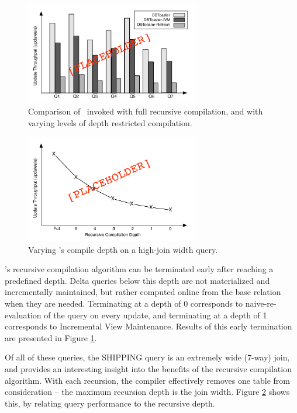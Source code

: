 \begin{figure}
\begin{center}
\includegraphics[width=3in]{../graphics-tmp/placeholder_throughput_all}
\end{center}
\label{fig:experiments:throughput_depth}
\caption{Comparison of \dbtoaster\ invoked with full recursive compilation, and with varying levels of depth restricted compilation.}
\end{figure}

\begin{figure}
\begin{center}
\includegraphics[width=3in]{../graphics-tmp/placeholder_throughput_ssb4}
\end{center}
\label{fig:experiments:throughput_depth_ssb4}
\caption{Varying \dbtoaster 's compile depth on a high-join width query.}
\end{figure}

\dbtoaster 's recursive compilation algorithm can be terminated early after reaching a predefined depth.  Delta queries below this depth are not materialized and incrementally maintained, but rather computed online from the base relation when they are needed.  Terminating at a depth of 0 corresponds to naive-re-evaluation of the query on every update, and terminating at a depth of 1 corresponds to Incremental View Maintenance.  Results of this early termination are presented in Figure \ref{fig:experiments:throughput_depth}.  

Of all of these queries, the SHIPPING query is an extremely wide (7-way) join, and provides an interesting insight into the benefits of the recursive compilation algorithm.  With each recursion, the compiler effectively removes one table from consideration -- the maximum recursion depth is the join width.  Figure \ref{fig:experiments:throughput_depth_ssb4} shows this, by relating query performance to the recursive depth.

